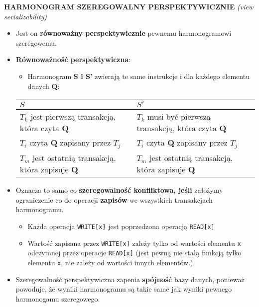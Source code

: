 \documentclass[a5paper,6pt]{article}
\begin{document}
    \textbf{HARMONOGRAM SZEREGOWALNY PERSPEKTYWICZNIE}
    \textit{(view serializability)}
    \begin{itemize}
        \item Jest on \textbf{równoważny perspektywicznie} pewnemu
        harmonogramowi szeregowemu.
        \item \textbf{Równoważność perspektywiczna}:
        \begin{itemize}
            \item Harmonogram \textbf{S i S'} zwierają te same instrukcje i dla
                  każdego elementu danych \textbf{Q}:
        \end{itemize}

\begin{adjustbox}{width=\columnwidth,center}
    \begin{tabular}{|l|l|}
        \hline
        $S$ & $S'$ \\
        \hline
        $T_k$ jest pierwszą transakcją, która czyta \textbf{Q} &
        $T_k$ musi być pierwszą transakcją, która czyta \textbf{Q} \\

        $T_i$ czyta \textbf{Q} zapisany przez $T_j$ &
        $T_i$ czyta \textbf{Q} zapisany przez $T_j$\\

        $T_m$ jest ostatnią transakcją, która zapisuje \textbf{Q} &
        $T_m$ jest ostatnią transakcją, która zapisuje \textbf{Q}\\
        \hline
    \end{tabular}
\end{adjustbox}

        \item Oznacza to samo co \textbf{szeregowalność konfliktowa, jeśli}
              założymy ograniczenie co do operacji \textbf{zapisów} we
              wszystkich transakcjach harmonogramu.
        \begin{itemize}
            \item Każda operacja \texttt{WRITE[x]} jest poprzedzona operacją
                  \texttt{READ[x]}
            \item Wartość zapisana przez \texttt{WRITE[x]} zależy tylko od
                  wartości elementu \texttt{x} odczytanej przez operacje
                  \texttt{READ[x]} (jest pewną nie stałą funkcją tylko elementu
                  \texttt{x}, nie zależy od wartości innych elementów.)
        \end{itemize}

        \item Szeregowalność perspektywiczna zapenia \textbf{spójność} bazy
              danych, ponieważ powoduje, że wyniki harmonogramu są takie same
              jak wyniki pewnego harmonogamu szeregowego.
    \end{itemize}
\end{document}
